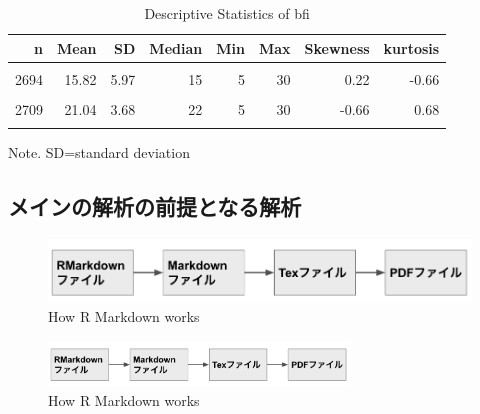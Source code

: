 \documentclass[12pt,a4paper,xelatex,ja=standard]{bxjsarticle}
\begin{document}
\begin{table}[!h]
\centering
\caption{\label{tab:unnamed-chunk-4}Descriptive Statistics of bfi}
\centering
\begin{tabular}[t]{rrrrrrrr}
\toprule
n & Mean & SD & Median & Min & Max & Skewness & kurtosis\\
\midrule
\cellcolor{gray!10}{2713} & \cellcolor{gray!10}{18.96} & \cellcolor{gray!10}{2.71} & \cellcolor{gray!10}{19} & \cellcolor{gray!10}{5} & \cellcolor{gray!10}{29} & \cellcolor{gray!10}{0.01} & \cellcolor{gray!10}{1.08}\\
2694 & 15.82 & 5.97 & 15 & 5 & 30 & 0.22 & -0.66\\
\cellcolor{gray!10}{2707} & \cellcolor{gray!10}{19.04} & \cellcolor{gray!10}{2.77} & \cellcolor{gray!10}{19} & \cellcolor{gray!10}{5} & \cellcolor{gray!10}{30} & \cellcolor{gray!10}{-0.17} & \cellcolor{gray!10}{0.81}\\
2709 & 21.04 & 3.68 & 22 & 5 & 30 & -0.66 & 0.68\\
\cellcolor{gray!10}{2726} & \cellcolor{gray!10}{19.34} & \cellcolor{gray!10}{2.74} & \cellcolor{gray!10}{19} & \cellcolor{gray!10}{5} & \cellcolor{gray!10}{29} & \cellcolor{gray!10}{-0.02} & \cellcolor{gray!10}{1.09}\\
\bottomrule
\end{tabular}
\end{table}

\begin{center}
Note. SD=standard deviation
\end{center}

\subsection{メインの解析の前提となる解析}\label{ux30e1ux30a4ux30f3ux306eux89e3ux6790ux306eux524dux63d0ux3068ux306aux308bux89e3ux6790}

\begin{figure}
\centering
\includegraphics{fig1.png}
\caption{How R Markdown works}
\end{figure}

\begin{figure}[H]
\centering
\includegraphics[clip,width = 8cm]{fig1.png}
\caption{How R Markdown works}    
\end{figure}
\end{document}
